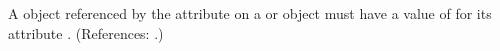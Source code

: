 A \Parameter object referenced by the attribute  on
a \Species or \Model object must have a value of  for its
attribute .  (References: .)
